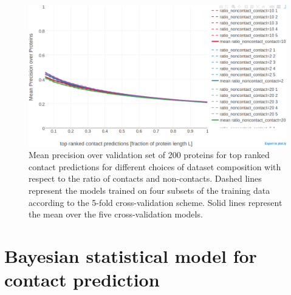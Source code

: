\documentclass[11pt,a4paper,twoside]{book}
\theoremstyle{definition}
\theoremstyle{definition}
\theoremstyle{remark}
\begin{document}
\begin{figure}

{\centering \includegraphics[width=0.9\linewidth]{img/random_forest_contact_prior/cross_validation/precision_vs_rank_cv_on_test_random_forest_nestimators1000_maxfeatureslog2_maxdepth10_minsamplesleaf100_ratio} 

}

\caption{Mean precision over
validation set of 200 proteins for top ranked contact predictions for
different choices of dataset composition with respect to the ratio of
contacts and non-contacts. Dashed lines represent the models trained on
four subsets of the training data according to the 5-fold
cross-validation scheme. Solid lines represent the mean over the five
cross-validation models.}\label{fig:random-forest-rationoncontactthr-cv}
\end{figure}

\chapter{Bayesian statistical model for contact
prediction}\label{bayesian-statistical-model-for-contact-prediction}
\end{document}
